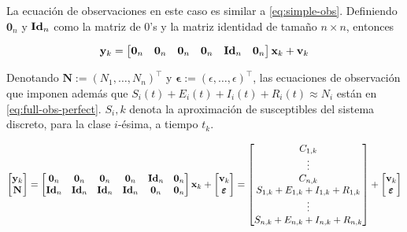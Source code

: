 La ecuación de observaciones en este caso es similar a \ref{eq:simple-obs}. Definiendo \(\mathbf{0}_n\) y \(\text{\textbf{Id}}_n\) como la matriz de 0's y la matriz identidad de tamaño \(n \times n\), entonces 

\begin{equation} \label{eq:full-obs}
\mathbf{y}_{k} = 
\begin{bmatrix}\mathbf{0}_n & \mathbf{0}_n & \mathbf{0}_n & \mathbf{0}_n & \text{\textbf{Id}}_n & \mathbf{0}_n \end{bmatrix} \mathbf{x}_{k} + \mathbf{v}_k
\end{equation}

Denotando \(\mathbf{N} := (N_1, \dots, N_n)^{\top}\) y \(\pmb{\epsilon} := (\epsilon, \dots, \epsilon)^{\top}\), las ecuaciones de observación que imponen además que \(S_i(t) + E_i(t) + I_i(t) + R_i(t) \approx N_i\) están en \ref{eq:full-obs-perfect}. \(S_i, k\) denota la aproximación de susceptibles del sistema discreto, para la clase \(i\)-ésima, a tiempo \(t_k\).

\begin{equation} \label{eq:full-obs-perfect}
\begin{bmatrix}
\mathbf{y}_{k} \\
\mathbf{N}
\end{bmatrix} = 
\begin{bmatrix}
\mathbf{0}_n & \mathbf{0}_n & \mathbf{0}_n & \mathbf{0}_n & \text{\textbf{Id}}_n & \mathbf{0}_n \\
\text{\textbf{Id}}_n & \text{\textbf{Id}}_n & \text{\textbf{Id}}_n & \text{\textbf{Id}}_n & \mathbf{0}_n & \mathbf{0}_n \\
\end{bmatrix}
\mathbf{x}_{k} + 
\begin{bmatrix}
\mathbf{v}_k \\
\pmb{\epsilon}
\end{bmatrix} =
\begin{bmatrix}
C_{1,k} \\
\vdots \\
C_{n,k} \\
S_{1,k} + E_{1,k} + I_{1,k} + R_{1,k} \\
\vdots \\
S_{n,k} + E_{n,k} + I_{n,k} + R_{n,k}
\end{bmatrix}
 + 
\begin{bmatrix}
\mathbf{v}_k \\
\pmb{\epsilon}
\end{bmatrix}
\end{equation}


